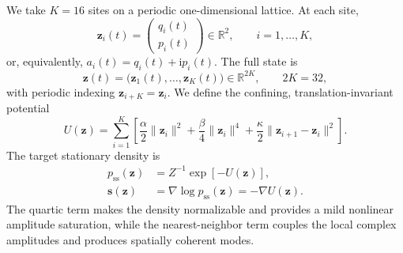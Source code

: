 \documentclass[11pt,twoside,fleqn]{article}
\begin{document}
We take \(K=16\) sites on a periodic one-dimensional lattice. At each site,
\[
    \bm{z}_i(t)
    =
    \begin{pmatrix}
        q_i(t)\\
        p_i(t)
    \end{pmatrix}
    \in\mathbb{R}^2,
    \qquad
    i=1,\ldots,K,
\]
or, equivalently, \(a_i(t)=q_i(t)+\mathrm{i}p_i(t)\). The full state is
\begin{equation}
    \bm{z}(t)
    =
    \bigl(\bm{z}_1(t),\ldots,\bm{z}_K(t)\bigr)
    \in\mathbb{R}^{2K},
    \qquad
    2K=32,
    \label{eq:cgl_chain_state_definition}
\end{equation}
with periodic indexing \(\bm{z}_{i+K}=\bm{z}_i\). We define the confining, translation-invariant potential
\begin{equation}
    U(\bm{z})
    =
    \sum_{i=1}^{K}
    \left[
        \frac{\alpha}{2}\|\bm{z}_i\|^2
        +
        \frac{\beta}{4}\|\bm{z}_i\|^4
        +
        \frac{\kappa}{2}\|\bm{z}_{i+1}-\bm{z}_i\|^2
    \right].
    \label{eq:cgl_chain_potential}
\end{equation}
The target stationary density is
\begin{equation}
\begin{aligned}
    p_{\mathrm{ss}}(\bm{z})
    &=
    Z^{-1}\exp[-U(\bm{z})],
    \\
    \bm{s}(\bm{z})
    &=
    \nabla\log p_{\mathrm{ss}}(\bm{z})
    =
    -\nabla U(\bm{z}).
\end{aligned}
    \label{eq:cgl_chain_stationary_density_score}
\end{equation}
The quartic term makes the density normalizable and provides a mild nonlinear amplitude saturation, while the nearest-neighbor term couples the local complex amplitudes and produces spatially coherent modes.
\end{document}
